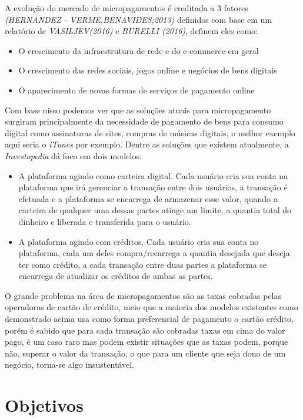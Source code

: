 \documentclass[hidelinks,12pt]{article}
\begin{document}
A evolu\c{c}\~ao do mercado de  micropagamentos \'e creditada a 3 fatores \textit{(HERNANDEZ - VERME,BENAVIDES;2013)} definidos com base em um relat\'orio de \textit{VASILJEV(2016)} e \textit{BURELLI (2016)}, definem eles como: 
\begin{itemize}
	\item O crescimento da infraestrutura de rede e do e-commerce em geral
	\item O crescimento das redes sociais, jogos online e neg\'ocios de bens digitais
	\item O aparecimento de novas formas de servi\c{c}os de pagamento online
\end{itemize}
Com base nisso podemos ver que as solu\c{c}\~oes atuais para micropagamento surgiram principalmente da necessidade de pagamento de bens para consumo digital como assinaturas de sites, compras de m\'usicas digitais, o melhor exemplo aqui seria o \textit{iTunes} por exemplo.
Dentre as solu\c{c}\~oes que existem atualmente, a \textit{Investopedia} d\'a foco em dois modelos:
\begin{itemize}
	\item A plataforma agindo como carteira digital. Cada usu\'ario cria sua conta na plataforma que ir\'a gerenciar a transa\c{c}\~ao entre dois usu\'arios, a transa\c{c}\~ao \'e efetuada e a plataforma se encarrega de armazenar esse valor, quando a carteira de qualquer uma dessas partes atinge um limite, a quantia total do dinheiro e liberada e transferida para o usu\'ario.
	\item A plataforma agindo com cr\'editos. Cada usu\'ario cria sua conta no plataforma, cada um deles compra/recarrega a quantia desejada que deseja ter como cr\'edito, a cada transa\c{c}\~ao entre duas partes a plataforma se encarrega de atualizar os cr\'editos de ambas as partes.
\end{itemize}
O grande problema na \'area de micropagamentos s\~ao as taxas cobradas pelas operadoras de cart\~ao de cr\'edito, meio que a maioria dos modelos existentes como demonstrado acima usa como forma preferencial de pagamento o cart\~ao cr\'edito, por\'em \'e sabido que para cada transa\c{c}\~ao s\~ao cobradas taxas em cima do valor pago, \'e um caso raro mas podem existir situa\c{c}\~oes que as taxas podem, porque n\~ao, superar o valor da transa\c{c}\~ao, o que para um cliente que seja dono de um neg\'ocio, torna-se algo insustent\'avel.
\newpage
\section{Objetivos}
\end{document}
